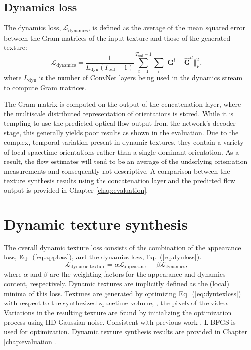 \subsection{Dynamics loss}

The dynamics loss, $\mathcal{L}_\text{dynamics}$, is defined as
the average of the mean squared error between the Gram matrices
of the input texture
and those of the generated texture:
\begin{equation}
   \mathcal{L}_\text{dynamics} = \frac{1}{L_\text{dyn} (T_\text{out}-1)}\sum_{t=1}^{T_\text{out}-1} \sum_{l}  \Vert \mathbf{G}^l - \hat{\mathbf{G}}^{lt}\Vert^2_F, \label{eq:dynloss}
\end{equation}
where $L_\text{dyn}$ is the number of ConvNet layers being used
in the dynamics stream to compute Gram matrices.

The Gram matrix is computed on the output of the concatenation layer,
where the multiscale distributed representation of orientations is
stored. While it is tempting to use the predicted optical flow output from the
network's decoder stage, this generally yields poor results as shown in the evaluation.
Due to the complex, temporal variation present in dynamic
textures, they contain a variety of local spacetime
orientations rather than a single dominant orientation.
As a result, the flow estimates will tend to be an average of the
underlying  orientation measurements and consequently not
descriptive. A comparison between the texture synthesis results using the concatenation layer and the predicted flow output is provided in Chapter \ref{chap:evaluation}.

\section{Dynamic texture synthesis}\label{sec:texgen}
The overall dynamic texture loss consists of the combination of the appearance loss, Eq.\ (\ref{eq:apploss}),
and the dynamics loss, Eq.\ (\ref{eq:dynloss}):
\begin{equation}
   \mathcal{L}_\text{dynamic texture} = \alpha\mathcal{L}_\text{appearance} + \beta \mathcal{L}_\text{dynamics}, \label{eq:dyntexloss}
\end{equation}
where $\alpha$ and $\beta$ are the weighting factors for the
appearance and dynamics content, respectively.
Dynamic textures are implicitly defined as the (local) minima 
of this loss.
Textures are generated by optimizing Eq.\ 
(\ref{eq:dyntexloss}) with respect to the synthesized spacetime volume,
\ie, the pixels of the video. 
Variations in the resulting texture are found by initializing the
optimization process using IID Gaussian noise.
Consistent with previous work \cite{gatys2015}, L-BFGS \cite{liu1989} is used for optimization. Dynamic texture synthesis results are provided in Chapter \ref{chap:evaluation}.

